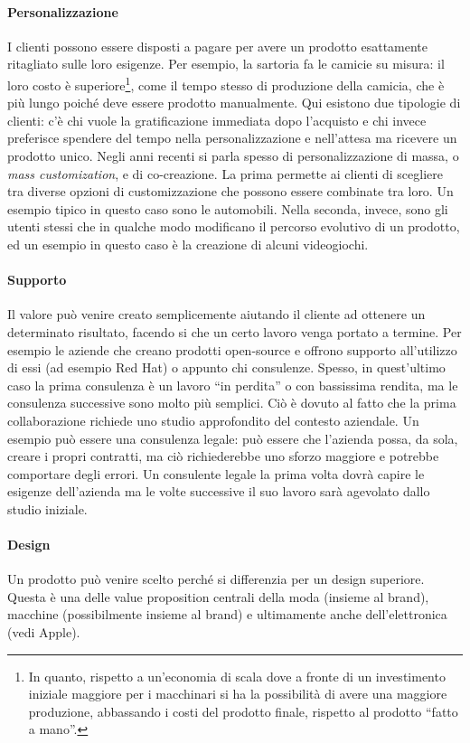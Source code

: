 \paragraph*{Personalizzazione} I clienti possono essere disposti a pagare per
avere un prodotto esattamente ritagliato sulle loro esigenze. Per esempio, la
sartoria fa le camicie su misura: il loro costo è superiore\footnote{In quanto,
rispetto a un'economia di scala dove a fronte di un investimento iniziale
maggiore per i macchinari si ha la possibilità di avere una maggiore
produzione, abbassando i costi del prodotto finale, rispetto al prodotto
``fatto a mano''.}, come il tempo stesso di produzione della camicia, che
è più lungo poiché deve essere prodotto manualmente. Qui esistono due tipologie
di clienti: c'è chi vuole la gratificazione immediata dopo l'acquisto e chi
invece preferisce spendere del tempo nella personalizzazione e nell'attesa ma
ricevere un prodotto unico.
Negli anni recenti si parla spesso di personalizzazione di massa, o
\textit{mass customization}, e di co-creazione. La prima permette ai clienti di
scegliere tra diverse opzioni di customizzazione che possono essere combinate
tra loro. Un esempio tipico in questo caso sono le automobili. Nella seconda,
invece, sono gli utenti stessi che in qualche modo modificano il percorso
evolutivo di un prodotto, ed un esempio in questo caso è la creazione di alcuni
videogiochi.

\paragraph*{Supporto} Il valore può venire creato semplicemente aiutando il
cliente ad ottenere un determinato risultato, facendo si che un certo lavoro
venga portato a termine. Per esempio le aziende che creano prodotti
open-source e offrono supporto all'utilizzo di essi (ad esempio Red Hat) o
appunto chi consulenze. Spesso, in quest'ultimo caso la
prima consulenza è un lavoro ``in perdita'' o con bassissima rendita, ma le
consulenza successive sono molto più semplici. Ciò è dovuto al fatto che la
prima collaborazione richiede uno studio approfondito del contesto aziendale.
Un esempio può essere una consulenza legale: può essere che l'azienda possa, da
sola, creare i propri contratti, ma ciò richiederebbe uno sforzo maggiore e
potrebbe comportare degli errori. Un consulente legale la prima volta dovrà
capire le esigenze dell'azienda ma le volte successive il suo lavoro sarà
agevolato dallo studio iniziale.

\paragraph*{Design} Un prodotto può venire scelto perché si differenzia per un
design superiore. Questa è una delle value proposition centrali della moda
(insieme al brand), macchine (possibilmente insieme al brand) e ultimamente
anche dell'elettronica (vedi Apple).

